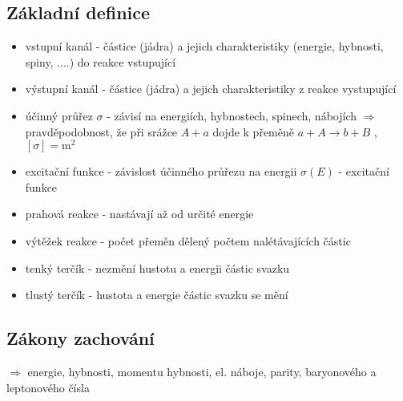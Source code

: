 \documentclass[../../main.tex]{subfiles}
\begin{document}
\subsection{Základní definice}
\begin{itemize}
	\item vstupní kanál - částice (jádra) a jejich charakteristiky (energie, hybnosti, spiny, ....) do reakce vstupující
	\item výstupní kanál - částice (jádra) a jejich charakteristiky z reakce vystupující
	\item účinný průřez $\sigma$ - závisí na energiích, hybnostech, spinech, nábojích $\Rightarrow$ pravděpodobnost, že při srážce $A+a$ dojde k přeměně $a+A \rightarrow b+B$ , $[\sigma] = \mathrm{m^2}$
	\item excitační funkce - závislost účinného průřezu na energii $\sigma (E)$ - excitační funkce
	\item prahová reakce - nastávají až od určité energie
	\item výtěžek reakce - počet přeměn dělený počtem nalétávajících částic
	\item tenký terčík - nezmění hustotu a energii částic svazku
	\item tlustý terčík - hustota a energie částic svazku se mění
\end{itemize}

\subsection{Zákony zachování}

$\Rightarrow$ energie, hybnosti, momentu hybnosti, el. náboje, parity, baryonového a leptonového čísla
\end{document}
